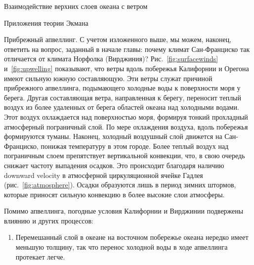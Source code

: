 \begin{chapter}{Взаимодействие верхних слоев океана с ветром}
\begin{section}{Приложения теории Экмана}
\begin{paragraph}{Прибрежный апвеллинг.}
С учетом изложенного выше, мы можем, наконец, ответить на вопрос, заданный
в начале главы: почему климат Сан-Франциско так отличается от климата 
Норфолка (Вирджиния)? Рис.~\ref{fig:surfacewinds} и~\ref{fig:upwelling}
показывают, что ветры вдоль побережья Калифорнии и Орегона имеют сильную
южную составляющую. Эти ветры служат причиной прибрежного 
апвеллинга, подымающего холодные воды 
к поверхности моря у берега. 
Другая составляющая ветра, направленная к берегу, переносит
теплый воздух из более удаленных от берега областей океана над холодными водами. Этот воздух охлаждается над поверхностью моря, формируя тонкий
прохладный атмосферный пограничный слой. По мере охлаждения воздуха, вдоль
побережья формируются туманы. Наконец, холодный воздушный слой движется на
Сан-Франциско, понижая температуру в этом городе. Более теплый воздух над
пограничным слоем препятствует вертикальной конвекции, что, в свою очередь
снижает частоту выпадения осадков. Это происходит благодаря наличию
downward velocity в атмосферной циркуляционной ячейке 
Гадлея (рис.~\ref{fig:atmosphere}). Осадки образуются лишь в период зимних
штормов, которые приносят сильную конвекцию в более высокие слои атмосферы.
%

Помимо апвеллинга, погодные условия Калифорнии
и Вирджинии подвержены влиянию и других процессов:
%
%
\begin{enumerate}
\item 
Перемешанный слой в океане 
на восточном побережье океана нередко имеет меньшую толщину, так что перенос
холодной воды в ходе апвеллинга протекает легче.
%


\end{enumerate}
\end{paragraph}
\end{section}
\end{chapter}
